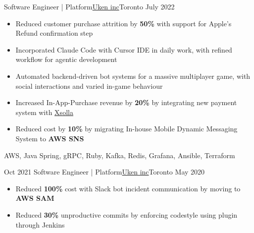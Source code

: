 %
%
%
\begin{experiences}
  \experienceCurrent
    {Software Engineer | Platform}{\href{https://uken.com}{Uken inc}}{Toronto}
    {July 2022} {
                    \begin{itemize}
                        \setlength\itemsep{0.6em}

                        \item Reduced customer purchase attrition by \textbf{50\%} with support for Apple's Refund confirmation step

                        \item Incorporated Claude Code with Cursor IDE in daily work, with refined workflow for agentic development

                        \item Automated backend-driven bot systems for a massive multiplayer game, with social interactions and varied in-game behaviour

                        \item Increased In-App-Purchase revenue by \textbf{20\%} by integrating new payment system with \href{https://xsolla.com}{Xsolla} 

                        \item Reduced cost by \textbf{10\%} by migrating In-house Mobile Dynamic Messaging System to \textbf{AWS SNS}
                    \end{itemize}
                    }
                    {AWS, Java Spring, gRPC, Ruby, Kafka, Redis, Grafana, Ansible, Terraform}

  \emptySeparator
  \experience
    {Oct 2021}   {Software Engineer | Platform}{\href{https://uken.com}{Uken inc}}{Toronto}
    {May 2020} {
                    \begin{itemize}
                        \setlength\itemsep{0.6em}
                        \item Reduced \textbf{100\%} cost with Slack bot incident communication by moving to \textbf{AWS SAM}
                        
                        \item Reduced \textbf{30\%} unproductive commits by enforcing codestyle using  plugin through Jenkins


\end{itemize}}
\end{experiences}
